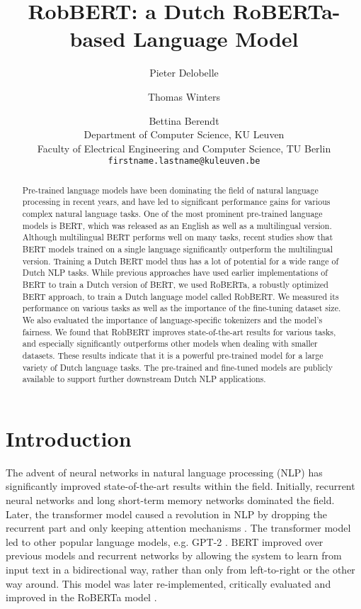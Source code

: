 \documentclass[11pt,a4paper]{article}
\title{RobBERT: a Dutch RoBERTa-based Language Model}
\author{Pieter Delobelle \and Thomas Winters \and Bettina Berendt\\
 Department of Computer Science, KU Leuven \\
 Faculty of Electrical Engineering and Computer Science, TU Berlin \\
\texttt{firstname.lastname@kuleuven.be}}
\date{}
\begin{document}
\maketitle
\begin{abstract}
Pre-trained language models have been dominating the field of natural language processing in recent years, and have led to significant performance gains for various complex natural language tasks.
One of the most prominent pre-trained language models is BERT, which was released as an English as well as a multilingual version.
Although multilingual BERT performs well on many tasks, recent studies show that BERT models trained on a single language significantly outperform the multilingual version.
Training a Dutch BERT model thus has a lot of potential for a wide range of Dutch NLP tasks.
While previous approaches have used earlier implementations of BERT to train a Dutch version of BERT, we used RoBERTa, a robustly optimized BERT approach, to train a Dutch language model called RobBERT.
We measured its performance on various tasks as well as the importance of the fine-tuning dataset size.
We also evaluated the importance of language-specific tokenizers and the model's fairness.
We found that RobBERT improves state-of-the-art results for various tasks, and especially significantly outperforms other models when dealing with smaller datasets.
These results indicate that it is a powerful pre-trained model for a large variety of Dutch language tasks.
The pre-trained and fine-tuned models are publicly available to support further downstream Dutch NLP applications.
\end{abstract}

\section{Introduction}

The advent of neural networks in natural language processing (NLP) has significantly improved state-of-the-art results within the field.
Initially, recurrent neural networks and long short-term memory networks dominated the field.
Later, the transformer model caused a revolution in NLP by dropping the recurrent part and only keeping attention mechanisms \citep{vaswaniAttention2017}.
The transformer model led to other popular language models, e.g. GPT-2 \citep{radford2018gpt,radford2019gpt2}.
BERT \citep{devlinBERT2019a} improved over previous models and recurrent networks by allowing the system to learn from input text in a bidirectional way, rather than only from left-to-right or the other way around.
This model was later re-implemented, critically evaluated and improved in the RoBERTa model \citep{liuRoBERTa2019}.
\end{document}
